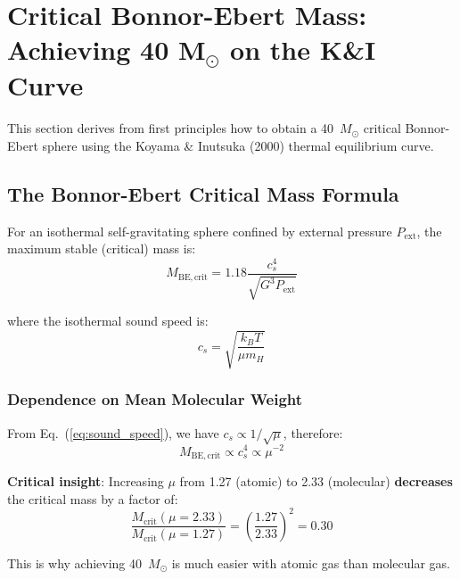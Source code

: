 \documentclass[11pt,a4paper]{article}
\newcommand{\Msun}{M_\odot}
\begin{document}
\section{Critical Bonnor-Ebert Mass: Achieving 40 M$_\odot$ on the K\&I Curve}
\label{sec:be_critical_mass}

This section derives from first principles how to obtain a 40~$\Msun$ critical
Bonnor-Ebert sphere using the Koyama \& Inutsuka (2000) thermal equilibrium curve.

\subsection{The Bonnor-Ebert Critical Mass Formula}

For an isothermal self-gravitating sphere confined by external pressure $P_\mathrm{ext}$,
the maximum stable (critical) mass is:
\begin{equation}
    M_\mathrm{BE,crit} = 1.18 \frac{c_s^4}{\sqrt{G^3 P_\mathrm{ext}}}
    \label{eq:be_crit_mass}
\end{equation}

where the isothermal sound speed is:
\begin{equation}
    c_s = \sqrt{\frac{k_B T}{\mu m_H}}
    \label{eq:sound_speed}
\end{equation}

\subsubsection{Dependence on Mean Molecular Weight}

From Eq.~(\ref{eq:sound_speed}), we have $c_s \propto 1/\sqrt{\mu}$, therefore:
\begin{equation}
    M_\mathrm{BE,crit} \propto c_s^4 \propto \mu^{-2}
\end{equation}

\textbf{Critical insight}: Increasing $\mu$ from 1.27 (atomic) to 2.33 (molecular)
\textbf{decreases} the critical mass by a factor of:
\begin{equation}
    \frac{M_\mathrm{crit}(\mu=2.33)}{M_\mathrm{crit}(\mu=1.27)} = \left(\frac{1.27}{2.33}\right)^2 = 0.30
\end{equation}

This is why achieving 40~$\Msun$ is much easier with atomic gas than molecular gas.
\end{document}
